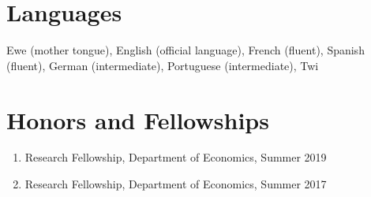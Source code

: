 \documentclass[letterpaper]{article}
\begin{document}
\section*{Languages}
Ewe (mother tongue), English (official language), French (fluent), Spanish (fluent), German (intermediate),  Portuguese (intermediate), Twi

\section*{Honors and Fellowships}
\begin{enumerate}
  \item Research Fellowship, Department of Economics, Summer 2019
  \item Research Fellowship, Department of Economics, Summer 2017
\end{enumerate}
\end{document}
